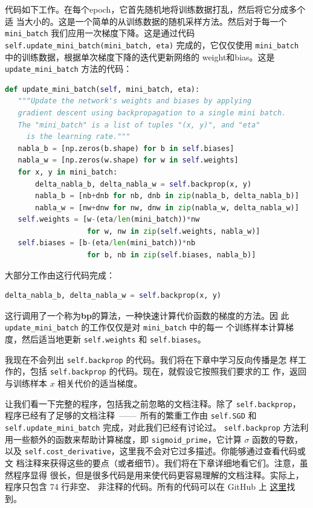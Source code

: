 代码如下工作。在每个\gls*{epoch}，它首先随机地将训练数据打乱，然后将它分成多个适
当大小的\minibatch{}。这是一个简单的从训练数据的随机采样方法。然后对于每一个
\lstinline!mini_batch! 我们应用一次梯度下降。这是通过代码
\lstinline!self.update_mini_batch(mini_batch, eta)! 完成的，它仅仅使用
\lstinline!mini_batch! 中的训练数据，根据单次梯度下降的迭代更新网络的%
\gls*{weight}和\gls*{bias}。这是 \lstinline!update_mini_batch! 方法的代码：
\begin{lstlisting}[language=Python]
def update_mini_batch(self, mini_batch, eta):
   """Update the network's weights and biases by applying
   gradient descent using backpropagation to a single mini batch.
   The "mini_batch" is a list of tuples "(x, y)", and "eta"
     is the learning rate."""
   nabla_b = [np.zeros(b.shape) for b in self.biases]
   nabla_w = [np.zeros(w.shape) for w in self.weights]
   for x, y in mini_batch:
       delta_nabla_b, delta_nabla_w = self.backprop(x, y)
       nabla_b = [nb+dnb for nb, dnb in zip(nabla_b, delta_nabla_b)]
       nabla_w = [nw+dnw for nw, dnw in zip(nabla_w, delta_nabla_w)]
   self.weights = [w-(eta/len(mini_batch))*nw
                   for w, nw in zip(self.weights, nabla_w)]
   self.biases = [b-(eta/len(mini_batch))*nb
                   for b, nb in zip(self.biases, nabla_b)]
\end{lstlisting}

大部分工作由这行代码完成：
\begin{lstlisting}[language=Python]
     delta_nabla_b, delta_nabla_w = self.backprop(x, y)
\end{lstlisting}

这行调用了一个称为\textbf{\gls{bp}}的算法，一种快速计算代价函数的梯度的方法。因
此 \lstinline!update_mini_batch! 的工作仅仅是对 \lstinline!mini_batch! 中的每一
个训练样本计算梯度，然后适当地更新 \lstinline!self.weights! 和
\lstinline!self.biases!。

我现在不会列出 \lstinline!self.backprop! 的代码。我们将在下章中学习反向传播是怎
样工作的，包括 \lstinline!self.backprop! 的代码。现在，就假设它按照我们要求的工
作，返回与训练样本 $x$ 相关代价的适当梯度。

让我们看一下完整的程序，包括我之前忽略的文档注释。除了 \lstinline!self.backprop!，
程序已经有了足够的文档注释~——~所有的繁重工作由 \lstinline!self.SGD! 和
\lstinline!self.update_mini_batch! 完成，对此我们已经有讨论过。
\lstinline!self.backprop! 方法利用一些额外的函数来帮助计算梯度，即
\lstinline!sigmoid_prime!，它计算 $\sigma$ 函数的导数，以及
\lstinline!self.cost_derivative!，这里我不会对它过多描述。你能够通过查看代码或文
档注释来获得这些的要点（或者细节）。我们将在下章详细地看它们。注意，虽然程序显得
很长，但是很多代码是用来使代码更容易理解的文档注释。实际上，程序只包含 74 行非空、
非注释的代码。所有的代码可以在 GitHub 上%
\href{https://github.com/mnielsen/neural-networks-and-deep-learning/blob/master/src/network.py}{
  这里}找到。

